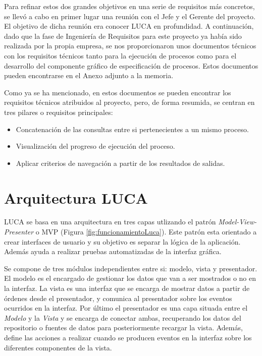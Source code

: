 Para refinar estos dos grandes objetivos en una serie de requisitos más concretos, se llevó a cabo en primer lugar una reunión con el Jefe y el Gerente del proyecto. El objetivo de dicha reunión era conocer LUCA en profundidad. A continuación, dado que la fase de Ingeniería de Requisitos para este proyecto ya había sido realizada por la propia empresa, se nos proporcionaron unos documentos técnicos con los requisitos técnicos tanto para la ejecución de procesos como para el desarrollo del componente gráfico de especificación de procesos. Estos documentos pueden encontrarse en el Anexo adjunto a la memoria.


Como ya se ha mencionado, en estos documentos se pueden encontrar los requisitos técnicos atribuidos al proyecto, pero, de forma resumida, se centran en tres pilares o requisitos principales:



\begin{itemize}
	\item Concatenación de las consultas entre si pertenecientes a un mismo proceso.
	\item Visualización del progreso de ejecución del proceso.
	\item Aplicar criterios de navegación a partir de los resultados de salidas.
\end{itemize}


\section{Arquitectura LUCA}

LUCA se basa en una arquitectura en tres capas utlizando el patrón \emph{Model-View-Presenter} o MVP\cite{mvp} (Figura \ref{fig:funcionamientoLuca}). Este patrón esta orientado a crear interfaces de usuario y su objetivo es separar la lógica de la aplicación. Además ayuda a realizar pruebas automatizadas de la interfaz gráfica. 

Se compone de tres módulos independientes entre si: modelo, vista y presentador. El modelo es el encargado de gestionar los datos que van a ser mostrados o no en la interfaz. La vista es una interfaz que se encarga de mostrar datos a partir de órdenes desde el presentador, y comunica al presentador sobre los eventos ocurridos en la interfaz. Por último el presentador es una capa situada entre el \emph{Modelo} y la \emph{Vista} y se encarga de conectar ambas, recuperando los datos del repositorio o fuentes de datos para posteriormente recargar la vista. Además, define las acciones a realizar cuando se producen eventos en la interfaz sobre los diferentes componentes de la vista.

